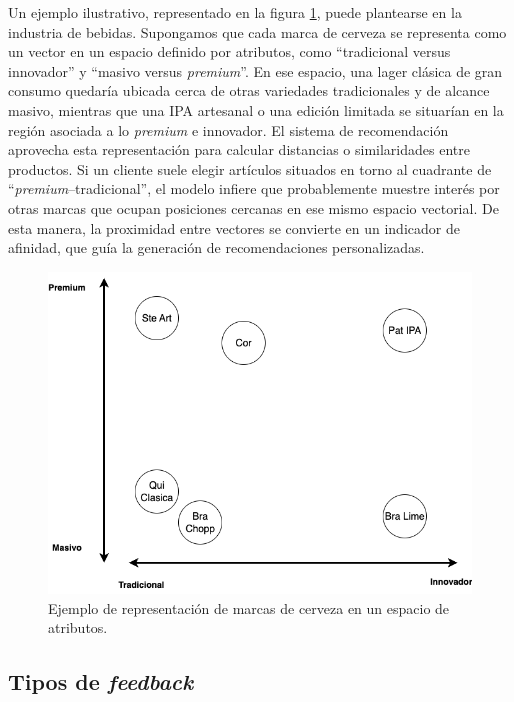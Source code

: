 Un ejemplo ilustrativo, representado en la figura \ref{fig:ejemploSimilitud}, puede plantearse en la industria de bebidas. Supongamos que cada marca de cerveza se representa como un vector en un espacio definido por atributos, como “tradicional versus innovador” y “masivo versus \textit{premium}”. En ese espacio, una lager clásica de gran consumo quedaría ubicada cerca de otras variedades tradicionales y de alcance masivo, mientras que una IPA artesanal o una edición limitada se situarían en la región asociada a lo \textit{premium} e innovador. El sistema de recomendación aprovecha esta representación para calcular distancias o similaridades entre productos. Si un cliente suele elegir artículos situados en torno al cuadrante de “\textit{premium}–tradicional”, el modelo infiere que probablemente muestre interés por otras marcas que ocupan posiciones cercanas en ese mismo espacio vectorial. De esta manera, la proximidad entre vectores se convierte en un indicador de afinidad, que guía la generación de recomendaciones personalizadas.

\begin{figure}[htpb]
	\centering
	\includegraphics[scale=.4]{./Figures/ejemploSimilitud.png}
	\caption{Ejemplo de representación de marcas de cerveza en un espacio de atributos.}
	\label{fig:ejemploSimilitud}
\end{figure}

\subsection{Tipos de \textit{feedback}}

